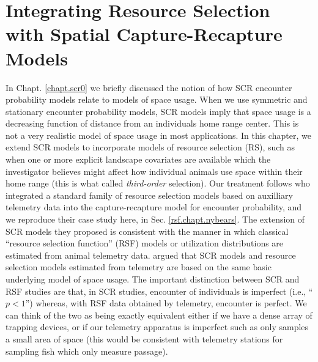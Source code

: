 \chapter{
Integrating Resource Selection 
with
Spatial Capture-Recapture
Models}

\label{chapt.rsf}

\vspace{.3in}

In Chapt. \ref{chapt.scr0} we briefly discussed the notion of how
SCR encounter probability models relate to models of space usage.
When we use symmetric and stationary encounter probability models, SCR
models imply that space usage is a decreasing function of distance
from an individuals home range center. This is not a very realistic
model of space usage in most applications.  In this chapter, we extend SCR
models to incorporate models of resource selection (RS), such as when
one or more explicit landscape covariates are available which the
investigator believes might affect how individual animals use space
within their home range (this is what \citep{johnson:1980} called {\it
  third-order} selection).  Our treatment follows
\citet{royle_etal:2012mee} who integrated a standard family of
resource selection models based on auxilliary telemetry data into the
capture-recapture model for encounter probability, and we reproduce
their case study here, in Sec. 
\ref{rsf.chapt.nybears}.
  The extension of SCR models
they proposed is consistent with the manner in which classical
``resource selection function'' (RSF) models \citep{manly_etal:2002}
or utilization distributions \citep{worton:1989, fieberg:2005,
  fieberg:2007} are estimated from animal telemetry data.
\citet{royle_etal:2012mee} argued that SCR models and resource
selection models estimated from telemetry are based on the same basic
underlying model of space usage. The important distinction between SCR
and RSF studies are that, in SCR studies, encounter of individuals is
imperfect (i.e., ``$p<1$'') whereas, with RSF data obtained by
telemetry, encounter is perfect. 
We can think of the two as being exactly
equivalent either if we have a dense array of trapping devices, or if
our telemetry apparatus is imperfect such as only samples a small area
of space (this would be consistent with telemetry stations for
sampling fish which only measure passage).


